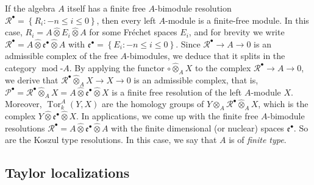 \documentclass[12pt]{amsart}%
\theoremstyle{plain}
\numberwithin{equation}{section}
\numberwithin{equation}{section}
\numberwithin{theorem}{section}
\numberwithin{lemma}{section}
\numberwithin{remark}{section}
\numberwithin{example}{section}
\numberwithin{proposition}{section}
\numberwithin{definition}{section}
\numberwithin{corollary}{section}
\begin{document}
If the algebra $A$ itself has a finite free $A$-bimodule resolution
$\mathcal{R}^{\bullet}=\left\{  R_{i}:-n\leq i\leq0\right\}  $, then every
left $A$-module is a finite-free module. In this case, $R_{i}%
=A\widehat{\otimes}E_{i}\widehat{\otimes}A$ for some Fr\'{e}chet spaces
$E_{i}$, and for brevity we write $\mathcal{R}^{\bullet}=A\widehat{\otimes
}\mathfrak{e}^{\bullet}\widehat{\otimes}A$ with $\mathfrak{e}^{\bullet
}=\left\{  E_{i}:-n\leq i\leq0\right\}  $. Since $\mathcal{R}^{\bullet
}\rightarrow A\rightarrow0$ is an admissible complex of the free
$A$-bimodules, we deduce \cite[3.1.18]{HelHom} that it splits in the category
$\operatorname{mod}$-$A$. By applying the functor $\circ\widehat{\otimes}%
_{A}X$ to the complex $\mathcal{R}^{\bullet}\rightarrow A\rightarrow0$, we
derive that $\mathcal{R}^{\bullet}\widehat{\otimes}_{A}X\rightarrow
X\rightarrow0$ is an admissible complex, that is, $\mathcal{P}^{\bullet
}=\mathcal{R}^{\bullet}\widehat{\otimes}_{A}X=A\widehat{\otimes}%
\mathfrak{e}^{\bullet}\widehat{\otimes}X$ is a finite free resolution of the
left $A$-module $X$. Moreover, $\operatorname{Tor}_{k}^{A}\left(  Y,X\right)
$ are the homology groups of $Y\widehat{\otimes}_{A}\mathcal{R}^{\bullet
}\widehat{\otimes}_{A}X$, which is the complex $Y\widehat{\otimes}%
\mathfrak{e}^{\bullet}\widehat{\otimes}X$. In applications, we come up with
the finite free $A$-bimodule resolutions $\mathcal{R}^{\bullet}%
=A\widehat{\otimes}\mathfrak{e}^{\bullet}\widehat{\otimes}A$ with the finite
dimensional (or nuclear) spaces $\mathfrak{e}^{\bullet}$. So are the Koszul
type resolutions. In this case, we say that $A$ is of \textit{finite type}.

\subsection{Taylor localizations\label{subsecTL}}
\end{document}
